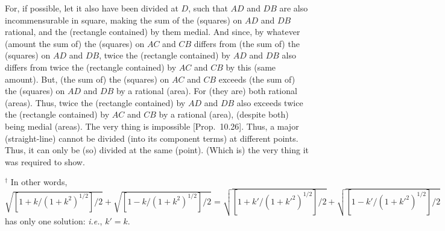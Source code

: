 \begin{Parallel}{}{}
{For, if possible, let it also have been divided at $D$, such that $AD$ and
$DB$ are also incommensurable in square, making the
sum of the (squares) on $AD$ and $DB$ rational, and the (rectangle contained) by them medial. And since, by whatever (amount the sum of)
the (squares) on $AC$ and $CB$ differs from (the sum of) the (squares)
on $AD$ and $DB$, 
twice the (rectangle contained) by $AD$ and $DB$ also differs from
twice the (rectangle contained) by $AC$ and $CB$ by this (same amount). But, (the sum of) the
(squares) on $AC$ and $CB$ exceeds (the sum of) the (squares) on
$AD$ and $DB$ by a rational (area). For (they are) both rational (areas). Thus, twice the
(rectangle contained) by $AD$ and $DB$ also exceeds twice the
(rectangle contained) by $AC$ and $CB$ by a rational (area), (despite both) being medial (areas).
The very thing is impossible [Prop.~10.26].
Thus, a major (straight-line) cannot be divided (into its component terms) at different points. Thus,
it can only be (so) divided at the same (point). (Which is) the very thing it was required to show.}
\end{Parallel}
{\footnotesize\noindent$^\dag$ In other words, $\sqrt{[1+k/(1+k^2)^{1/2}]/2} + \sqrt{[1-k/(1+k^2)^{1/2}]/2} =\sqrt{[1+k'/(1+{k'}^2)^{1/2}]/2} + \sqrt{[1-k'/(1+{k'}^2)^{1/2}]/2}$ has only one solution: {\em i.e.}, $k'=k$.}

